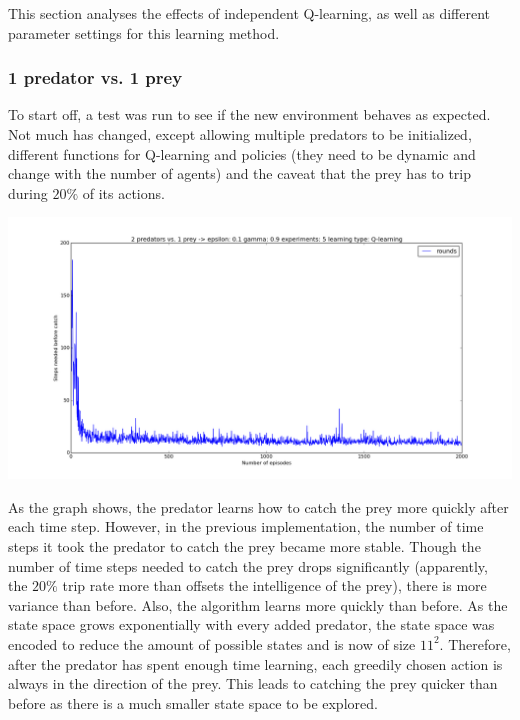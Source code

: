 This section analyses the effects of independent Q-learning, as well as different parameter settings for this learning method.
\subsubsection{1 predator vs. 1 prey}
To start off, a test was run to see if the new environment behaves as expected. Not much has changed, except allowing multiple predators to be initialized, different functions for Q-learning and policies (they need to be dynamic and change with the number of agents) and the caveat that the prey has to trip during $20\%$ of its actions.

\begin{center}
	\includegraphics[scale=0.3]{1_predator_1_prey_q_learning}
\end{center}

As the graph shows, the predator learns how to catch the prey more quickly after each time step. However, in the previous implementation, the number of time steps it took the predator to catch the prey became more stable. Though the number of time steps needed to catch the prey drops significantly (apparently, the $20\%$ trip rate more than offsets the intelligence of the prey), there is more variance than before. Also, the algorithm learns more quickly than before. As the state space grows exponentially with every added predator,  the state space was encoded to reduce the amount of possible states and is now of size $11^2$. Therefore, after the predator has spent enough time learning, each greedily chosen action is always in the direction of the prey. This leads to catching the prey quicker than before as there is a much smaller state space to be explored.

